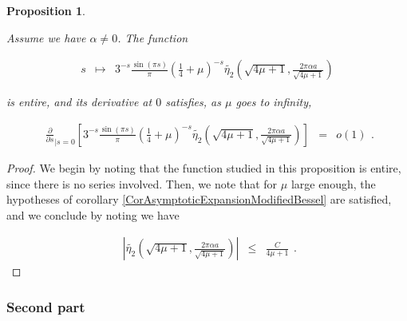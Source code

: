 \documentclass{jams-l}
\newtheorem{proposition}[theorem]{Proposition}
\theoremstyle{definition}
\theoremstyle{remark}
\numberwithin{equation}{section}
\begin{document}
            \begin{proposition}
            \label{PropA1-0}
            
                Assume we have $\alpha \neq 0$. The function
                
                \[ \begin{array}{lll}
                        s & \longmapsto & 3^{-s} \frac{\sin \left( \pi s \right)}{\pi} \left( \frac{1}{4} + \mu \right)^{-s} \widetilde{\eta_2} \left( \sqrt{4 \mu + 1}, \frac{2 \pi \alpha a}{\sqrt{4 \mu + 1}} \right)
                    \end{array} \]
                
                \noindent is entire, and its derivative at $0$ satisfies, as $\mu$ goes to infinity,
                
                \[ \begin{array}{lll}
                        \frac{\partial}{\partial s}_{\left \vert s = 0 \right.} \left[ 3^{-s} \frac{\sin \left( \pi s \right)}{\pi} \left( \frac{1}{4} + \mu \right)^{-s} \widetilde{\eta_2} \left( \sqrt{4 \mu + 1}, \frac{2 \pi \alpha a}{\sqrt{4 \mu + 1}} \right) \right] & = & o \left( 1 \right)
                    \end{array} . \]
            
            \end{proposition}
            
            \begin{proof}
            
                We begin by noting that the function studied in this proposition is entire, since there is no series involved. Then, we note that for $\mu$ large enough, the hypotheses of corollary \ref{CorAsymptoticExpansionModifiedBessel} are satisfied, and we conclude by noting we have
                
                \[ \begin{array}{lll}
                        \left \vert \widetilde{\eta_2} \left( \sqrt{4 \mu + 1}, \frac{2 \pi \alpha a}{\sqrt{4 \mu + 1}} \right) \right \vert & \leqslant & \frac{C}{4 \mu + 1}
                    \end{array} . \]
            
            \end{proof}
            
            
        \subsubsection*{\textbf{Second part}}
        \label{ASecondPart}
        
\end{document}
